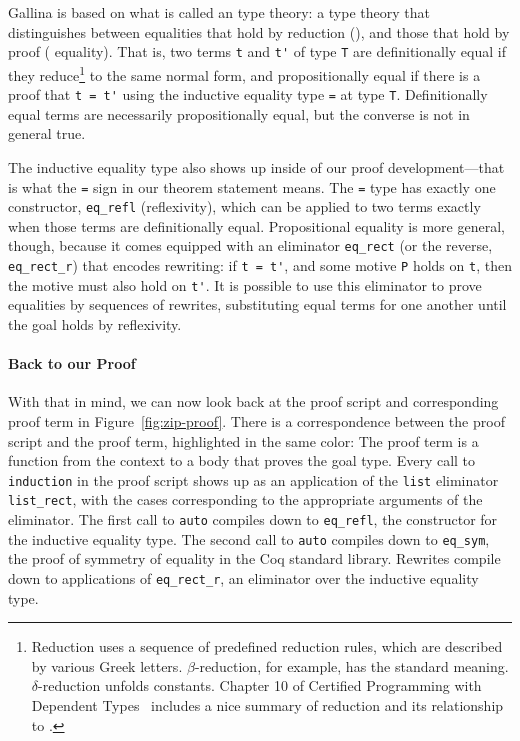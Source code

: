 Gallina is based on what is called an  type theory:
a type theory that distinguishes between equalities that hold by reduction (), and those that hold by proof ( equality).
That is, two terms \lstinline{t} and \lstinline{t'} of type \lstinline{T} are definitionally equal if they
reduce\footnote{Reduction uses a sequence of predefined reduction rules, which are described by various Greek letters. $\beta$-reduction, for example,
has the standard meaning. $\delta$-reduction unfolds constants. Chapter 10 of Certified Programming with Dependent Types~\cite{chlipala:cpdt} includes a nice summary of reduction and its relationship to .} 
to the same normal form,
and propositionally equal if there is a proof that \lstinline{t = t'} using the inductive
equality type \lstinline{=} at type \lstinline{T}. Definitionally equal terms are necessarily propositionally equal, but 
the converse is not in general true. %

The inductive equality type also shows up inside of our proof development---that is what the \lstinline{=} sign in our theorem statement means.
The \lstinline{=} type has exactly one constructor, \lstinline{eq_refl} (reflexivity), which can be applied to two terms exactly when those terms are definitionally equal.
Propositional equality is more general, though, because it comes equipped with an eliminator \lstinline{eq_rect} (or the reverse, \lstinline{eq_rect_r})
that encodes rewriting: if \lstinline{t = t'}, and some motive \lstinline{P} holds on \lstinline{t}, then the motive must also hold on \lstinline{t'}.
It is possible to use this eliminator to prove equalities by sequences of rewrites, substituting equal terms for one another until the goal holds by reflexivity.

\paragraph{Back to our Proof}

With that in mind, we can now look back at the proof script and corresponding proof term in Figure~\ref{fig:zip-proof}.
There is a correspondence between the proof script and the proof term, highlighted in the same color:
The proof term is a function from the context to a body that proves the goal type.
Every call to \lstinline{induction} in the proof script shows up as an application of the \lstinline{list} eliminator 
\lstinline{list_rect}, with the cases corresponding to the appropriate arguments of the eliminator.
The first call to \lstinline{auto} compiles down to \lstinline{eq_refl}, the constructor for the inductive equality type.
The second call to \lstinline{auto} compiles down to \lstinline{eq_sym}, the proof of symmetry of equality in the Coq standard library. %
Rewrites compile down to applications of \lstinline{eq_rect_r}, an eliminator over the inductive equality type.

